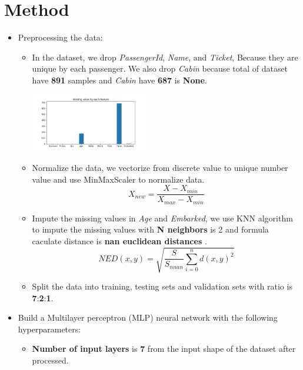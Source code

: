 \documentclass{article}
\begin{document}
\section{Method}

\begin{itemize}
    \item Preprocessing the data:
        \begin{itemize}
            \item In the dataset, we drop \textit{PassengerId}, \textit{Name}, and \textit{Ticket},
            Because they are unique by each passenger.
            We also drop \textit{Cabin} because total of dataset have \textbf{891} samples and \textit{Cabin} have \textbf{687} is \textbf{None}.
            \begin{center}
                \includegraphics[width=0.425\textwidth]{missing.png}   
            \end{center}
            \item Normalize the data, we vectorize from discrete value to unique number value and use MinMaxScaler to normalize data.
            \[
               X_{new} = \frac{X - X_{min}}{X_{max} - X_{min}}
            \]
            \item Impute the missing values in \textit{Age} and \textit{Embarked},
            we use KNN algorithm to impute the missing values with \textbf{N neighbors} is 2 and formula caculate distance is \textbf{nan euclidean distances} .
            \[
            NED(x,y) = \sqrt{\frac{S}{S_{nnan}} \sum^n_{i=0} d(x,y)^2 }  
            \]
            \item Split the data into training, testing sets and validation sets with ratio is \textbf{7}:\textbf{2}:\textbf{1}.
        \end{itemize}
    \item Build a Multilayer perceptron (MLP) neural network with the following hyperparameters:
        \begin{itemize}
            \item \textbf{Number of input layers} is \textbf{7} from the input shape of the dataset after processed.

\end{itemize}
\end{itemize}
\end{document}
